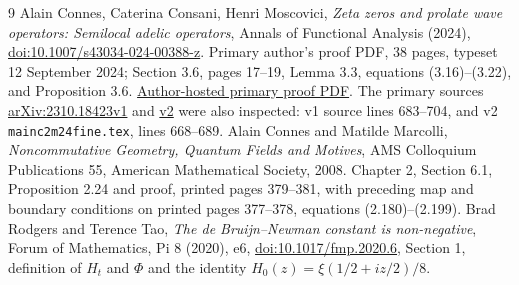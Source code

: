 \begin{thebibliography}{9}
 Alain Connes, Caterina Consani, Henri Moscovici,
\emph{Zeta zeros and prolate wave operators: Semilocal adelic operators},
Annals of Functional Analysis (2024),
\href{https://doi.org/10.1007/s43034-024-00388-z}{doi:10.1007/s43034-024-00388-z}.
Primary author's proof PDF, 38 pages, typeset 12 September 2024;
Section 3.6, pages 17--19, Lemma 3.3, equations (3.16)--(3.22),
and Proposition 3.6.
\href{https://alainconnes.org/wp-content/uploads/Zeta-zeros-and-prolateproofs-final-2024.pdf}{Author-hosted primary proof PDF}.
The primary sources
\href{https://arxiv.org/abs/2310.18423v1}{arXiv:2310.18423v1}
and \href{https://arxiv.org/abs/2310.18423v2}{v2} were also inspected:
v1 source lines 683--704, and v2
\texttt{mainc2m24fine.tex}, lines 668--689.
 Alain Connes and Matilde Marcolli,
\emph{Noncommutative Geometry, Quantum Fields and Motives},
AMS Colloquium Publications 55, American Mathematical Society, 2008.
Chapter 2, Section 6.1, Proposition 2.24 and proof,
printed pages 379--381, with preceding map and boundary conditions
on printed pages 377--378, equations (2.180)--(2.199).
 Brad Rodgers and Terence Tao,
\emph{The de Bruijn--Newman constant is non-negative},
Forum of Mathematics, Pi 8 (2020), e6,
\href{https://doi.org/10.1017/fmp.2020.6}{doi:10.1017/fmp.2020.6},
Section 1, definition of $H_t$ and $\Phi$ and the identity
$H_0(z)=\xi(1/2+iz/2)/8$.
\end{thebibliography}
